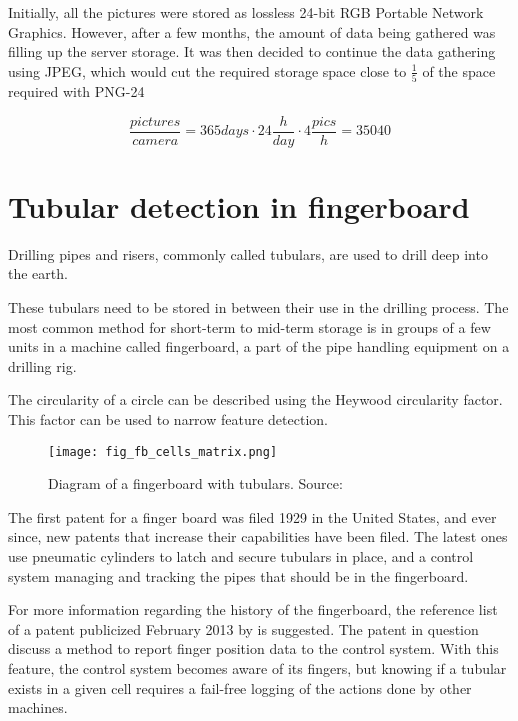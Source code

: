 Initially, all the pictures were stored as lossless 24-bit RGB Portable Network Graphics. However, after a few months, the amount of data being gathered was filling up the server storage. It was then decided to continue the data gathering using JPEG, which would cut the required storage space close to $\frac{1}{5}$ of the space required with PNG-24

\begin{equation}
\frac{pictures}{camera}=365 days\cdot 24\frac{h}{day}\cdot 4\frac{pics}{h}=35040
\end{equation}

\section{Tubular detection in fingerboard}
Drilling pipes and risers, commonly called tubulars, are used to drill deep into the earth.

These tubulars need to be stored in between their use in the drilling process. The most common method for short-term to mid-term storage is in groups of a few units in a machine called fingerboard, a part of the pipe handling equipment on a drilling rig.

The circularity of a circle can be described using the Heywood circularity factor. This factor can be used to narrow feature detection.

\begin{figure}[ht]
    \centering
    \texttt{[image: fig\_fb\_cells\_matrix.png]}
    \caption{Diagram of a fingerboard with tubulars. Source:\cite{fig_fb_cells_matrix13}}
    \label{fig:fb_cells_matrix}
\end{figure}
\FloatBarrier

The first patent for a finger board was filed 1929 in the United States, and ever since, new patents that increase their capabilities have been filed. The latest ones use pneumatic cylinders to latch and secure tubulars in place, and a control system managing and tracking the pipes that should be in the fingerboard.

For more information regarding the history of the fingerboard, the reference list of a patent publicized February 2013 by \citet{pat_james13} is suggested. The patent in question discuss a method to report finger position data to the control system. With this feature, the control system becomes aware of its fingers, but knowing if a tubular exists in a given cell requires a fail-free logging of the actions done by other machines.

